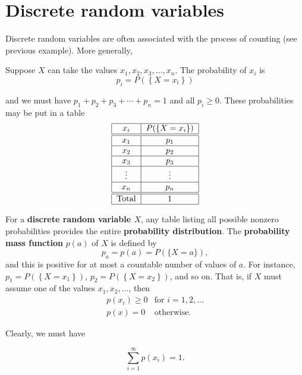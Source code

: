 \documentclass[smaller, handout]{beamer}\usepackage[]{graphicx}\usepackage[]{color}
\newcommand{\bea}{\begin{eqnarray}}
\newcommand{\eea}{\end{eqnarray}}
\newcommand{\nn}{\nonumber}
\begin{document}
\section{Discrete random variables}


\begin{frame}{\secname}
  Discrete random variables are often associated with the process of counting (see previous
  example). More generally,
  \begin{definition}
  Suppose $X$ can take the values $x_{1},x_{2},x_{3},\ldots ,x_{n}$. The probability of $x_{i}$ is
  $$p_{i}= P(\left\{ X=x_i\right\})$$

  and we must have $p_{1}+p_{2}+p_{3}+\cdots +p_{n}=1$ and all $p_{i}\geq 0$. These probabilities may be put in a table%
  \begin{equation*}
  \begin{tabular}{|c|c|}
  \hline
  $x_i $ & $P(\left\{ X=x_i\right\}) $ \\ \hline\hline
  $x_{1}$ & $p_{1}$ \\ \hline
  $x_{2}$ & $p_{2}$ \\ \hline
  $x_{3}$ & $p_{3}$ \\ \hline
  $\vdots $ & $\vdots $ \\ \hline
  $x_{n}$ & $p_{n}$ \\ \hline\hline
  Total & $1$ \\ \hline
  \end{tabular}
  \end{equation*}
  \end{definition}
\end{frame}

\begin{frame}{\secname}
  For a \textbf{discrete random variable $X$}, any table listing all
  possible nonzero probabilities provides the entire \textbf{probability
  distribution}. The \textbf{probability mass function} $p(a)$ of $X$ is defined by
  $$ p_a = p(a)= P(\{X=a \}),
  $$
  and this is positive for at most a countable number of values of $a$. For instance,
  $p_{1} = P(\left\{ X=x_1\right\})$, $p_{2} = P(\left\{ X=x_2\right\})$, and so on.
  That is, if $X$ must assume
  one of the values $x_1,x_2,...$, then
  \bea
   p(x_i) \geq 0 & \text{for \ \ } i=1,2,... \nn \\
   p(x) = 0 & \text{otherwise.}
  \eea

  Clearly, we must have

  $$\sum_{i=1}^{\infty} p(x_i) = 1.$$

\end{frame}
\end{document}
